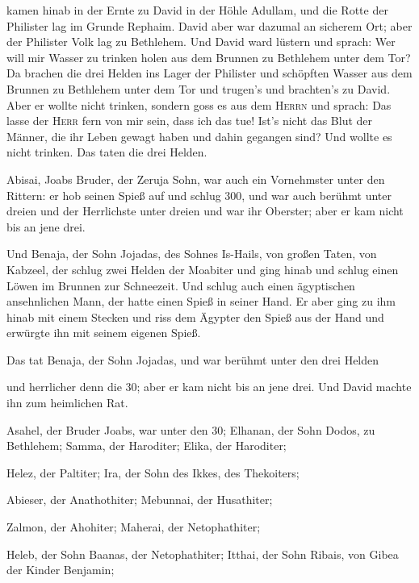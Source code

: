 kamen hinab in der Ernte zu David in der Höhle Adullam, und die Rotte
der Philister lag im Grunde Rephaim.  David aber war
dazumal an sicherem Ort; aber der Philister Volk lag zu Bethlehem.
 Und David ward lüstern und sprach: Wer will mir Wasser
zu trinken holen aus dem Brunnen zu Bethlehem unter dem Tor?
 Da brachen die drei Helden ins Lager der Philister und
schöpften Wasser aus dem Brunnen zu Bethlehem unter dem Tor und trugen's
und brachten's zu David. Aber er wollte nicht trinken, sondern goss es
aus dem \textsc{Herrn}  und sprach: Das lasse der
\textsc{Herr} fern von mir sein, dass ich das tue! Ist's nicht das Blut
der Männer, die ihr Leben gewagt haben und dahin gegangen sind? Und
wollte es nicht trinken. Das taten die drei Helden.

 Abisai, Joabs Bruder, der Zeruja Sohn, war auch ein
Vornehmster unter den Rittern: er hob seinen Spieß auf und schlug 300,
und war auch berühmt unter dreien  und der Herrlichste
unter dreien und war ihr Oberster; aber er kam nicht bis an jene drei.

 Und Benaja, der Sohn Jojadas, des Sohnes Is-Hails, von
großen Taten, von Kabzeel, der schlug zwei Helden der Moabiter und ging
hinab und schlug einen Löwen im Brunnen zur Schneezeit. 
Und schlug auch einen ägyptischen ansehnlichen Mann, der hatte einen
Spieß in seiner Hand. Er aber ging zu ihm hinab mit einem Stecken und
riss dem Ägypter den Spieß aus der Hand und erwürgte ihn mit seinem
eigenen Spieß.

 Das tat Benaja, der Sohn Jojadas, und war berühmt unter
den drei Helden

 und herrlicher denn die 30; aber er kam nicht bis an
jene drei. Und David machte ihn zum heimlichen Rat.

 Asahel, der Bruder Joabs, war unter den 30; Elhanan, der
Sohn Dodos, zu Bethlehem;  Samma, der Haroditer; Elika,
der Haroditer;

 Helez, der Paltiter; Ira, der Sohn des Ikkes, des
Thekoiters;

 Abieser, der Anathothiter; Mebunnai, der Husathiter;

 Zalmon, der Ahohiter; Maherai, der Netophathiter;

 Heleb, der Sohn Baanas, der Netophathiter; Itthai, der
Sohn Ribais, von Gibea der Kinder Benjamin;

